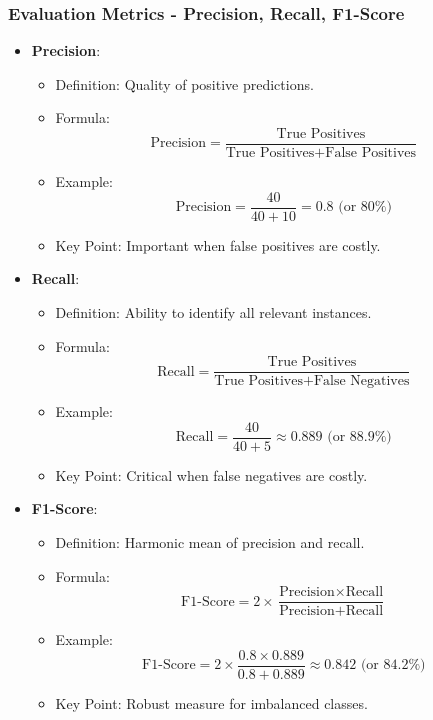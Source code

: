 \documentclass[aspectratio=169]{beamer}
\begin{document}
\begin{frame}[fragile]
    \frametitle{Evaluation Metrics - Precision, Recall, F1-Score}
    \begin{itemize}
        \item \textbf{Precision}:
        \begin{itemize}
            \item Definition: Quality of positive predictions.
            \item Formula:
            \[
            \text{Precision} = \frac{\text{True Positives}}{\text{True Positives} + \text{False Positives}}
            \]
            \item Example: 
            \[
            \text{Precision} = \frac{40}{40 + 10} = 0.8 \text{ (or 80\%)}
            \]
            \item Key Point: Important when false positives are costly.
        \end{itemize}
        
        \item \textbf{Recall}:
        \begin{itemize}
            \item Definition: Ability to identify all relevant instances.
            \item Formula:
            \[
            \text{Recall} = \frac{\text{True Positives}}{\text{True Positives} + \text{False Negatives}}
            \]
            \item Example: 
            \[
            \text{Recall} = \frac{40}{40 + 5} \approx 0.889 \text{ (or 88.9\%)}
            \]
            \item Key Point: Critical when false negatives are costly.
        \end{itemize}
        
        \item \textbf{F1-Score}:
        \begin{itemize}
            \item Definition: Harmonic mean of precision and recall.
            \item Formula:
            \[
            \text{F1-Score} = 2 \times \frac{\text{Precision} \times \text{Recall}}{\text{Precision} + \text{Recall}}
            \]
            \item Example: 
            \[
            \text{F1-Score} = 2 \times \frac{0.8 \times 0.889}{0.8 + 0.889} \approx 0.842 \text{ (or 84.2\%)}
            \]
            \item Key Point: Robust measure for imbalanced classes.
        \end{itemize}
    \end{itemize}
\end{frame}
\end{document}
